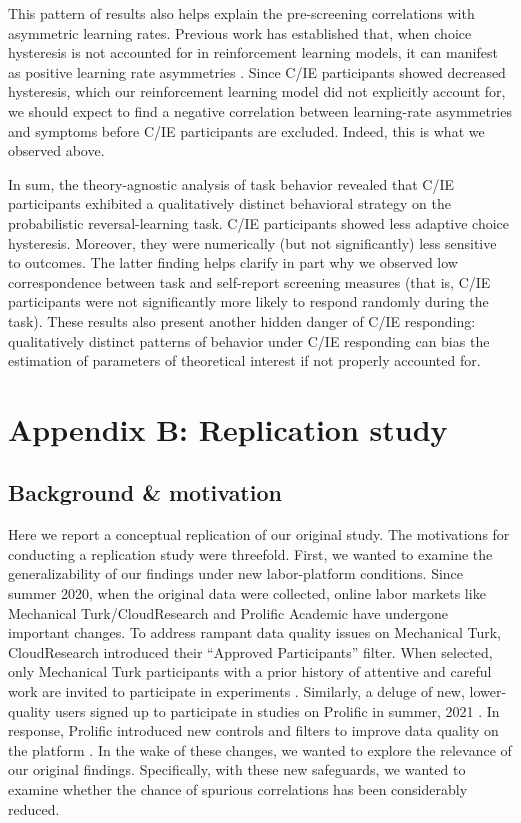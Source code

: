 \documentclass[a4paper,notitlepage,12pt]{article}
\begin{document}
\begin{refsection}[supp]
This pattern of results also helps explain the pre-screening correlations with asymmetric learning rates. Previous work has established that, when choice hysteresis is not accounted for in reinforcement learning models, it can manifest as positive learning rate asymmetries \cite{Katahira2018-ke, sugawara2021dissociation}. Since C/IE participants showed decreased hysteresis, which our reinforcement learning model did not explicitly account for, we should expect to find a negative correlation between learning-rate asymmetries and symptoms before C/IE participants are excluded. Indeed, this is what we observed above. 

In sum, the theory-agnostic analysis of task behavior revealed that C/IE participants exhibited a qualitatively distinct behavioral strategy on the probabilistic reversal-learning task. C/IE participants showed less adaptive choice hysteresis. Moreover, they were numerically (but not significantly) less sensitive to outcomes. The latter finding helps clarify in part why we observed low correspondence between task and self-report screening measures (that is, C/IE participants were not significantly more likely to respond randomly during the task). These results also present another hidden danger of C/IE responding: qualitatively distinct patterns of behavior under C/IE responding can bias the estimation of parameters of theoretical interest if not properly accounted for. 

\break
\section*{Appendix B: Replication study}

\subsection*{Background \& motivation}

Here we report a conceptual replication of our original study. The motivations for conducting a replication study were threefold. First, we wanted to examine the generalizability of our findings under new labor-platform conditions. Since summer 2020, when the original data were collected, online labor markets like Mechanical Turk/CloudResearch and Prolific Academic have undergone important changes. To address rampant data quality issues on Mechanical Turk, CloudResearch introduced their ``Approved Participants'' filter. When selected, only Mechanical Turk participants with a prior history of attentive and careful work are invited to participate in experiments \cite{cloudresearch_2020-2, hauser2021evaluating}. Similarly, a deluge of new, lower-quality users signed up to participate in studies on Prolific in summer, 2021 \cite{Letzter2021-bw}. In response, Prolific introduced new controls and filters to improve data quality on the platform \cite{prolific_2021}. In the wake of these changes, we wanted to explore the relevance of our original findings. Specifically, with these new safeguards, we wanted to examine whether the chance of spurious correlations has been considerably reduced. 


\end{refsection}
\end{document}
